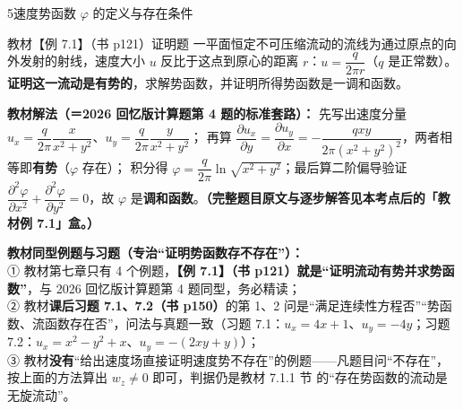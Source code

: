 \begin{kaodian}{5}{速度势函数 $\varphi$ 的定义与存在条件}
\begin{zhenti}{教材【例 7.1】（书 p121）}{证明题}
一平面恒定不可压缩流动的流线为通过原点的向外发射的射线，速度大小 $u$ 反比于这点到原心的距离 $r$：$u=\dfrac{q}{2\pi r}$（$q$ 是正常数）。\textbf{证明这一流动是有势的}，求解势函数，并证明所得势函数是一调和函数。
\end{zhenti}
\noindent\textbf{教材解法（＝2026 回忆版计算题第 4 题的标准套路）：}
先写出速度分量 $u_x=\dfrac{q}{2\pi}\dfrac{x}{x^2+y^2}$、$u_y=\dfrac{q}{2\pi}\dfrac{y}{x^2+y^2}$；
再算 $\dfrac{\partial u_x}{\partial y}=\dfrac{\partial u_y}{\partial x}=-\dfrac{qxy}{2\pi(x^2+y^2)^2}$，两者相等即\textbf{有势}（$\varphi$ 存在）；
积分得 $\varphi=\dfrac{q}{2\pi}\ln\sqrt{x^2+y^2}$；最后算二阶偏导验证 $\dfrac{\partial^2\varphi}{\partial x^2}+\dfrac{\partial^2\varphi}{\partial y^2}=0$，故 $\varphi$ 是\textbf{调和函数}。\textbf{（完整题目原文与逐步解答见本考点后的「教材例 7.1」盒。）}
\\

\begin{tishi}
\textbf{教材同型例题与习题（专治“证明势函数存不存在”）：}\\
① 教材第七章只有 4 个例题，\textbf{【例 7.1】（书 p121）就是“证明流动有势并求势函数”}，与 2026 回忆版计算题第 4 题同型，务必精读；\\
② 教材\textbf{课后习题 7.1、7.2（书 p150）}的第 1、2 问是“满足连续性方程否”“势函数、流函数存在否”，问法与真题一致（习题 7.1：$u_x=4x+1$、$u_y=-4y$；习题 7.2：$u_x=x^2-y^2+x$、$u_y=-(2xy+y)$）；\\
③ 教材\textbf{没有}“给出速度场直接证明速度势不存在”的例题——凡题目问“不存在”，按上面的方法算出 $w_z\ne0$ 即可，判据仍是教材 7.1.1 节 的“存在势函数的流动是无旋流动”。
\end{tishi}
\end{kaodian}

